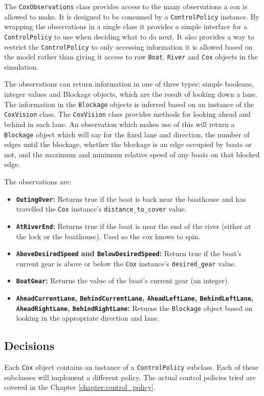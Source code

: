 The \texttt{CoxObservations} class provides access to the many observations a cox is allowed to make. It is designed to be consumed by a \texttt{ControlPolicy} instance. By wrapping the observations in a single class it provides a simple interface for a \texttt{ControlPolicy} to use when deciding what to do next. It also provides a way to restrict the \texttt{ControlPolicy} to only accessing information it is allowed based on the model rather than giving it access to raw \texttt{Boat}, \texttt{River} and \texttt{Cox} objects in the simulation.

The observations can return information in one of three types: simple booleans, integer values and Blockage objects, which are the result of looking down a lane. The information in the \texttt{Blockage} objects is inferred based on an instance of the \texttt{CoxVision} class. The \texttt{CoxVision} class provides methods for looking ahead and behind in each lane. An observation which makes use of this will return a \texttt{Blockage} object which will say for the fixed lane and direction, the number of edges until the blockage, whether the blockage is an edge occupied by boats or not, and the maximum and minimum relative speed of any boats on that blocked edge.

The observations are:
  \begin{itemize}
    \item{\textbf{\texttt{OutingOver}:}} Returns true if the boat is back near the boathouse and has travelled the \texttt{Cox} instance's \texttt{distance\_to\_cover} value.
    \item{\textbf{\texttt{AtRiverEnd}:}} Returns true if the boat is near the end of the river (either at the lock or the boathouse). Used so the cox knows to spin.
    \item{\textbf{\texttt{AboveDesiredSpeed} and \texttt{BelowDesiredSpeed}:}} Return true if the boat's current gear is above or below the \texttt{Cox} instance's \texttt{desired\_gear} value. 
    \item{\textbf{\texttt{BoatGear}:}} Returns the value of the boat's current gear (an integer).
    \item{\textbf{\texttt{AheadCurrentLane}, \texttt{BehindCurrentLane}, \texttt{AheadLeftLane}, \texttt{BehindLeftLane}, \texttt{AheadRightLane}, \texttt{BehindRightLane}:}} Returns the \texttt{Blockage} object based on looking in the appropriate direction and lane.
  \end{itemize}
  
\subsection{Decisions}\label{software:cox:decisions}
  Each \texttt{Cox} object contains an instance of a \texttt{ControlPolicy} subclass. Each of these subclasses will implement a different policy. The actual control policies tried are covered in the Chapter \ref{chapter:control_policy}. 
  
